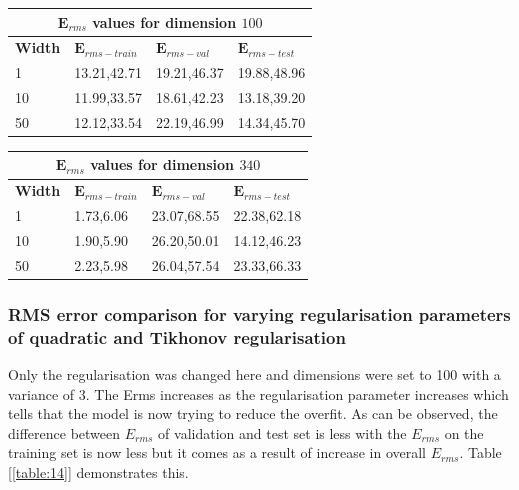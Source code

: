 {
\begin{table}[hptb]
\begin{tabular}{ |p{1.5cm}|p{3cm}|p{3cm}| p{3cm}|  }
\hline
\multicolumn{4}{|c|}{$\mathbf{E}_{rms}$ values for dimension $100$ } \\
\hline
\rowcolor{lightgray} \textbf{Width} & $\mathbf{E}_{rms-train}$ & $\mathbf{E}_{rms-val}$ & $\mathbf{E}_{rms-test}$ \\
\hline
  1   &   13.21,42.71   &    19.21,46.37      &     19.88,48.96 \\
 \hline
 10   &   11.99,33.57  &  18.61,42.23          &     13.18,39.20 \\
 \hline
 50   &   12.12,33.54  & 22.19,46.99 & 14.34,45.70 \\
\hline
\end{tabular}
\label{table:8}
\end{table}
}

{
\begin{table}[!h]
\begin{tabular}{ |p{1.5cm}|p{3cm}|p{3cm}| p{3cm}|  }
\hline
\multicolumn{4}{|c|}{$\mathbf{E}_{rms}$ values for dimension $340$ } \\
\hline
\rowcolor{lightgray} \textbf{Width} & $\mathbf{E}_{rms-train}$ & $\mathbf{E}_{rms-val}$ & $\mathbf{E}_{rms-test}$ \\
\hline
  1   &   1.73,6.06   &    23.07,68.55      &   22.38,62.18 \\
 \hline
 10   &   1.90,5.90  &  26.20,50.01          &   14.12,46.23 \\
 \hline
 50   &   2.23,5.98  & 26.04,57.54 & 23.33,66.33 \\
\hline
\end{tabular}
\label{table:8}
\end{table}
}

\newpage
\subsubsection{RMS error comparison for varying regularisation parameters of quadratic and Tikhonov regularisation}

Only the regularisation was changed here and dimensions were set to 100 with a variance of 3. The Erms increases as the regularisation parameter increases which tells that the model is now trying to reduce the overfit. As can be observed, the difference between $E_{rms}$ of validation and test set is less with the $E_{rms}$ on the training set is now less but it comes as a result of increase in overall $E_{rms}$. Table [\ref{table:14}] demonstrates this.

